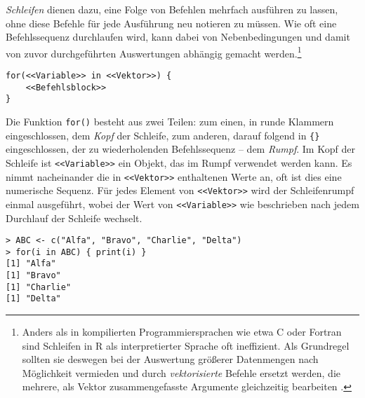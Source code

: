 \emph{Schleifen} dienen dazu, eine Folge von Befehlen mehrfach ausführen zu lassen, ohne diese Befehle für jede Ausführung neu notieren zu müssen. Wie oft eine Befehlssequenz durchlaufen wird, kann dabei von Nebenbedingungen und damit von zuvor durchgeführten Auswertungen abhängig gemacht werden.\footnote{Anders als in kompilierten Programmiersprachen wie etwa C oder Fortran sind Schleifen in R als interpretierter Sprache oft ineffizient. Als Grundregel sollten sie deswegen bei der Auswertung größerer Datenmengen nach Möglichkeit vermieden und durch \emph{vektorisierte} Befehle ersetzt werden, die mehrere, als Vektor zusammengefasste Argumente gleichzeitig bearbeiten \cite{Ligges2008}.}
\begin{lstlisting}
for(<<Variable>> in <<Vektor>>) {
    <<Befehlsblock>>
}
\end{lstlisting}

Die Funktion \lstinline!for()! besteht aus zwei Teilen: zum einen, in runde Klammern eingeschlossen, dem \emph{Kopf} der Schleife, zum anderen, darauf folgend in \lstinline!{}! eingeschlossen, der zu wiederholenden Befehlssequenz -- dem \emph{Rumpf}. Im Kopf der Schleife ist \lstinline!<<Variable>>! ein Objekt, das im Rumpf verwendet werden kann. Es nimmt nacheinander die in \lstinline!<<Vektor>>! enthaltenen Werte an, oft ist dies eine numerische Sequenz. Für jedes Element von \lstinline!<<Vektor>>! wird der Schleifenrumpf einmal ausgeführt, wobei der Wert von \lstinline!<<Variable>>! wie beschrieben nach jedem Durchlauf der Schleife wechselt.
\begin{lstlisting}
> ABC <- c("Alfa", "Bravo", "Charlie", "Delta")
> for(i in ABC) { print(i) }
[1] "Alfa"
[1] "Bravo"
[1] "Charlie"
[1] "Delta"
\end{lstlisting}

